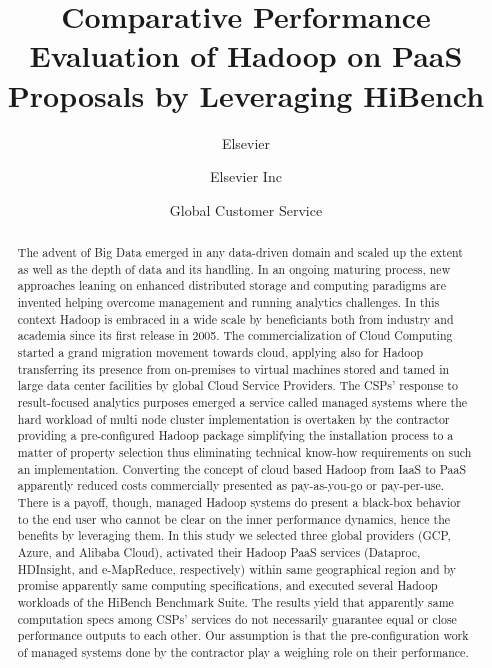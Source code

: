 \documentclass[review]{elsarticle}
\begin{document}
\begin{frontmatter}

\title{Comparative Performance Evaluation of Hadoop on PaaS Proposals by Leveraging HiBench}

\author{Elsevier}
\address{Radarweg 29, Amsterdam}

\author[mymainaddress,mysecondaryaddress]{Elsevier Inc}

\author[mysecondaryaddress]{Global Customer Service}

\address[mymainaddress]{1600 John F Kennedy Boulevard, Philadelphia}
\address[mysecondaryaddress]{360 Park Avenue South, New York}

\begin{abstract}
The advent of Big Data emerged in any data-driven domain and scaled up the extent as well as the depth of data and its handling. In an ongoing maturing process, new approaches leaning on enhanced distributed storage and computing paradigms are invented helping overcome management and running analytics challenges. In this context Hadoop is embraced in a wide scale by beneficiants both from industry and academia since its first release in 2005. The commercialization of Cloud Computing started a grand migration movement towards cloud, applying also for Hadoop transferring its presence from on-premises to virtual machines stored and tamed in large data center facilities by global Cloud Service Providers. The CSPs' response to result-focused analytics purposes emerged a service called managed systems where the hard workload of multi node cluster implementation is overtaken by the contractor providing a pre-configured Hadoop package simplifying the installation process to a matter of property selection thus eliminating technical know-how requirements on such an implementation. Converting the concept of cloud based Hadoop from IaaS to PaaS apparently reduced costs commercially presented as pay-as-you-go or pay-per-use. There is a payoff, though, managed Hadoop systems do present a black-box behavior to the end user who cannot be clear on the inner performance dynamics, hence the benefits by leveraging them. In this study we selected three global providers (GCP, Azure, and Alibaba Cloud), activated their Hadoop PaaS services (Dataproc, HDInsight, and e-MapReduce, respectively) within same geographical region and by promise apparently same computing specifications, and executed several Hadoop workloads of the HiBench Benchmark Suite. The results yield that apparently same computation specs among CSPs' services do not necessarily guarantee equal or close performance outputs to each other. Our assumption is that the pre-configuration work of managed systems done by the contractor play a weighing role on their performance.
\end{abstract}


\end{frontmatter}
\end{document}
